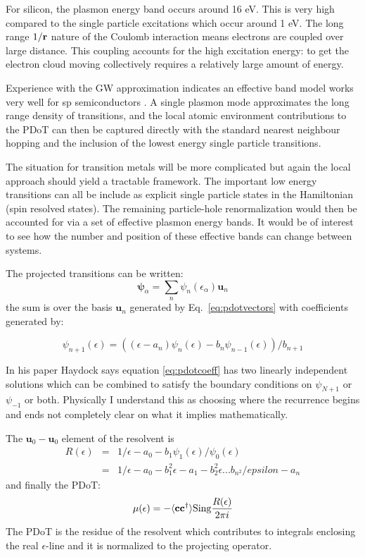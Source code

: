 For silicon, the plasmon energy band occurs around 16 eV. This is very high compared
to the single particle excitations which occur around 1 eV. The long range $1/{\bf r}$ nature of the Coulomb
interaction means electrons are coupled over large distance.
This coupling accounts for the high excitation energy: to get the
electron cloud moving collectively requires a relatively large amount of energy.

Experience with the GW approximation indicates an effective band model works very well
for sp semiconductors \cite{godbyneeds, hybertsenlouie, bergstressen}. 
A single plasmon mode approximates the long range density of transitions, and the local
atomic environment contributions to the PDoT can then be captured directly with the standard nearest
neighbour hopping and the inclusion of the lowest energy single particle transitions.

The situation for transition metals will be more complicated but again the local approach should yield 
a tractable framework. The important low energy transitions can all be include as explicit single particle states
in the Hamiltonian (spin resolved states). The remaining particle-hole renormalization would then
be accounted for via a set of effective plasmon energy bands. It would be of interest to
see how the number and position of these effective bands can change between systems.

The projected transitions can be written:
%
\begin{equation}
\mathbf{\psi}_{\alpha} = \sum_{n} \psi_{n}(\epsilon_{\alpha})\mathbf{u}_{n}
\end{equation}
%
the sum is over the basis ${\mathbf{u}_{n}}$ generated by Eq.~\ref{eq:pdotvectors}
with coefficients generated by:

\begin{equation}
\label{eq:pdotcoeff}
\psi_{n+1}(\epsilon) = ((\epsilon-a_{n})\psi_{n}(\epsilon) - b_{n}\psi_{n-1}(\epsilon))/b_{n+1}
\end{equation}

In his paper Haydock says equation \ref{eq:pdotcoeff} has two linearly independent solutions
which can be combined to satisfy the boundary conditions on $\psi_{N+1}$ or $\psi_{-1}$ or both.
Physically I understand this as choosing where the recurrence begins and ends not completely
clear on what it implies mathematically.

The $\mathbf{u}_{0}-\mathbf{u}_{0}$ element of the resolvent is
%
\begin{eqnarray}
R(\epsilon)& = & 1/\epsilon-a_{0}-b_{1}\psi_{1}(\epsilon)/\psi_{0}(\epsilon) \\
  & = & 1/\epsilon-a_{0}-b^{2}_{1}\epsilon-a_{1}-b^{2}_{2}\epsilon ... b_{n^{2}}/epsilon-a_{n}
\end{eqnarray}
%
and finally the PDoT:
%
\begin{equation}
\mu(\epsilon) = -\langle \mathbf{c} \mathbf{c}^{\dagger}\rangle {\rm Sing} \frac{R(\epsilon)}{2\pi i}
\end{equation}
%
The PDoT is the residue of the resolvent which contributes to integrals enclosing the 
real $\epsilon$-line and it is normalized to the projecting operator.

